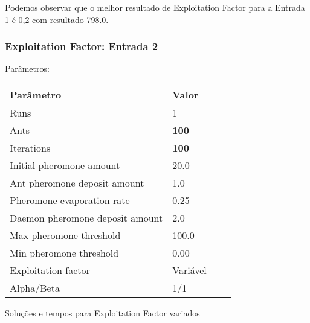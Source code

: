 \documentclass{article}
\begin{document}
\par
Podemos observar que o melhor resultado de Exploitation Factor para a Entrada 1 é 0,2 com resultado 798.0. 


\newpage



\subsubsection{Exploitation Factor: Entrada 2}
\par Parâmetros:
\newline
\begin{center}
    \begin{tabular}{| l | l | l | l |}
    \hline
    Parâmetro & Valor \\ \hline
    Runs & 1 \\ \hline
    Ants & \textbf{100} \\ \hline
    Iterations & \textbf{100} \\ \hline
    Initial pheromone amount & 20.0 \\ \hline
    Ant pheromone deposit amount & 1.0 \\ \hline
    Pheromone evaporation rate & 0.25 \\ \hline
    Daemon pheromone deposit amount & 2.0 \\ \hline
    Max pheromone threshold & 100.0 \\ \hline
    Min pheromone threshold & 0.00 \\ \hline
    Exploitation factor & Variável \\ \hline
    Alpha/Beta & 1/1 \\ \hline
    \end{tabular}
\end{center}

\par
Soluções e tempos para Exploitation Factor variados
\newline
\pgfplotsset{compat=newest}
\end{document}
